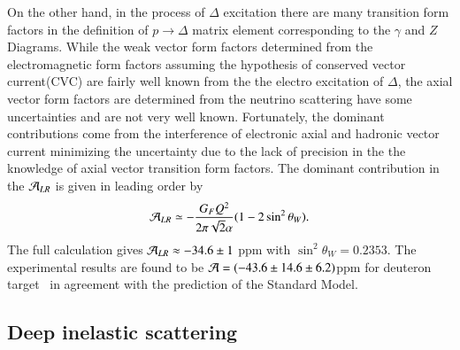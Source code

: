  On the other hand,  in the process of $\Delta$  excitation there are many transition form factors in the definition of  $p\rightarrow \Delta $ matrix element corresponding to the  $\gamma$ and $Z$ Diagrams. While the weak vector form factors determined from the electromagnetic form factors assuming the hypothesis of conserved vector current(CVC) are fairly well known from the the electro excitation of $\Delta$,  the axial vector form factors are determined from the neutrino scattering have some uncertainties and are not very well known.  Fortunately,  the dominant contributions come from the interference of electronic axial and hadronic vector current  minimizing the uncertainty due to the lack of precision in the the knowledge of axial vector transition form factors.  The dominant contribution in the ${\cal A}_{LR}$   is given in leading order by  
\begin{equation}
 {\cal A}_{LR}\simeq -\frac{G_F Q^2}{2\pi\sqrt{2}\alpha}(1-2\sin^2\theta_W).
\end{equation}
 The full calculation gives ${\cal A}_{LR}\approx-34.6\pm 1$ ppm with $\sin^2\theta_W=0.2353$. The experimental results are found to be ${\cal A}= (-43.6\pm14.6\pm6.2)$ppm for deuteron target~\cite{G0:2011aa} in agreement with the prediction of the Standard Model.


\subsection{Deep inelastic scattering}

